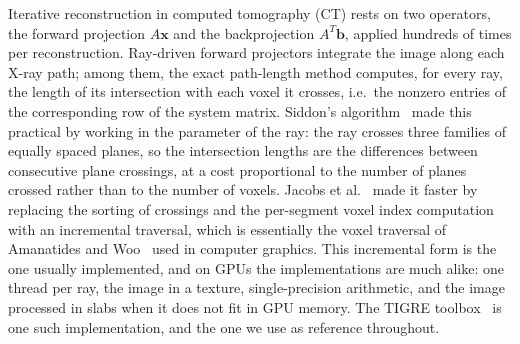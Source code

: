 \documentclass[11pt,a4paper]{article}
\theoremstyle{remark}
\begin{document}
Iterative reconstruction in computed tomography (CT) rests on two operators, the forward
projection $A\mathbf{x}$ and the backprojection $A^T\mathbf{b}$, applied hundreds of times per
reconstruction. Ray-driven forward projectors integrate the image along each X-ray path; among
them, the exact path-length method computes, for every ray, the length of its intersection with
each voxel it crosses, i.e.\ the nonzero entries of the corresponding row of the system matrix.
Siddon's algorithm~\cite{siddon1985fast} made this practical by working in the parameter of the
ray: the ray crosses three families of equally spaced planes, so the intersection lengths are the
differences between consecutive plane crossings, at a cost proportional to the number of planes
crossed rather than to the number of voxels. Jacobs et al.~\cite{jacobs1998fast} made it faster by
replacing the sorting of crossings and the per-segment voxel index computation with an incremental
traversal, which is essentially the voxel traversal of Amanatides and Woo~\cite{amanatides1987fast}
used in computer graphics. This incremental form is the one usually implemented, and on GPUs the
implementations are much alike: one thread per ray, the image in a texture, single-precision
arithmetic, and the image processed in slabs when it does not fit in GPU memory. The TIGRE
toolbox~\cite{tigre2016,tigre2020multigpu,tigre2025v3} is one such implementation, and the one we use as
reference throughout.
\end{document}
